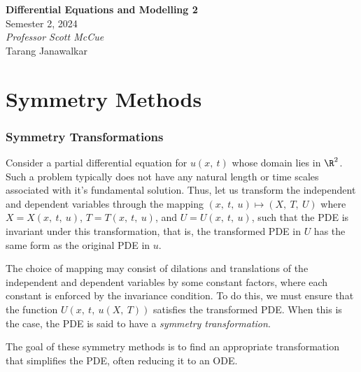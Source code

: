 \documentclass{article}
\date{}
\theoremstyle{definition}
\newcommand{\unitName}{Differential Equations and Modelling 2}
\newcommand{\unitTime}{Semester 2, 2024}
\newcommand{\unitCoordinator}{Professor Scott McCue}
\newcommand{\documentAuthors}{Tarang Janawalkar}
\begin{document}
%
\begin{titlepage}
    \vspace*{\fill}
    \begin{center}
        \LARGE{\textbf{\unitName}} \\[0.1in]
        \normalsize{\unitTime} \\[0.2in]
        \normalsize\textit{\unitCoordinator} \\[0.2in]
        \documentAuthors
    \end{center}
    \vspace*{\fill}
    \doclicenseThis
    \thispagestyle{empty}
\end{titlepage}
\newpage
%
\tableofcontents
\newpage
%
\part{Symmetry Methods}
\section{Symmetry Transformations}
Consider a partial differential equation for \(u\left( x,\: t \right)\)
whose domain lies in \(\R^2\). Such a problem typically does not have
any natural length or time scales associated with it's fundamental
solution. Thus, let us transform the independent and dependent
variables through the mapping \(\left( x,\: t,\: u \right) \mapsto
\left( X,\: T,\: U \right)\) where \(X = X\left( x,\: t,\: u \right)\),
\(T = T\left( x,\: t,\: u \right)\), and \(U = U\left( x,\: t,\: u
\right)\), such that the PDE is invariant under this transformation,
that is, the transformed PDE in \(U\) has the same form as the original
PDE in \(u\).

The choice of mapping may consist of dilations and translations of the
independent and dependent variables by some constant factors, where
each constant is enforced by the invariance condition. To do this, we
must ensure that the function \(U\left( x,\: t,\: u\left( X,\: T
\right) \right)\) satisfies the transformed PDE. When this is the case,
the PDE is said to have a \textit{symmetry transformation}.

The goal of these symmetry methods is to find an appropriate
transformation that simplifies the PDE, often reducing it to an ODE.
\end{document}
